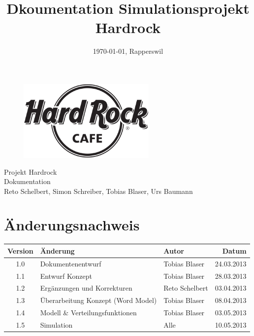 \documentclass[ngerman,a4paper,12pt]{scrreprt}
\title{Dkoumentation Simulationsprojekt Hardrock}
\date{\today{}, Rapperswil}
\def\author{Reto Schelbert, Simon Schreiber, Tobias Blaser, Urs Baumann}
\begin{document}
\thispagestyle{empty}
\begin{titlepage}
	\begin{center}

	\vspace*{40mm}
	
	\begin{figure}[htp]
		\centering
		\includegraphics[width=0.60\textwidth]{img/Hard-Rock-Cafe-Logo-Black-White.png}
	\end{figure}		
	\vspace*{20mm}
	
	{\fontsize{40}{48} \selectfont Projekt Hardrock \\[10mm]}
	{\fontsize{32}{48} \selectfont Dokumentation \\[5mm]}	
	\vspace*{20mm}
	\author

\end{center}
\end{titlepage}
\clearpage

\chapter*{Änderungsnachweis}
\begin{tabularx}{\textwidth}{|cXlr|} %
		\hline
		\textbf{Version} & \textbf{Änderung} & \textbf{Autor} & \textbf{Datum}\\
		\hline
		1.0 & Dokumentenentwurf & Tobias Blaser & 24.03.2013 \\
		1.1 & Entwurf Konzept & Tobias Blaser & 28.03.2013 \\
		1.2 & Ergänzungen und Korrekturen & Reto Schelbert & 03.04.2013 \\
		1.3 & Überarbeitung Konzept (Word Model) & Tobias Blaser & 08.04.2013 \\
		1.4 & Modell \& Verteilungsfunktionen & Tobias Blaser & 03.05.2013 \\
		1.5 & Simulation & Alle & 10.05.2013 \\
		\hline
\end{tabularx}
\end{document}
